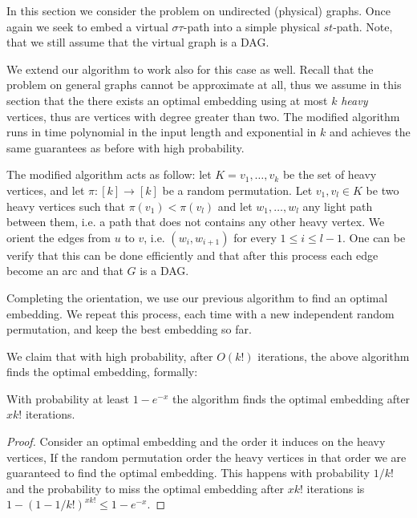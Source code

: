 In this section we consider the problem on undirected (physical) graphs.
Once again we seek to embed a virtual $\sigma\tau$-path 
into a simple physical $st$-path.
Note, that we still assume that the virtual graph is a DAG. 

We extend our algorithm to work also for this case as well.
Recall that the problem on general graphs cannot be approximate at all,
thus we assume in this section that the there exists an optimal embedding using
at most $k$ \emph{heavy} vertices, thus are vertices with degree greater than two.
The modified algorithm runs in time polynomial in the input length and
exponential in $k$ and achieves the same guarantees as before with high
probability.

The modified algorithm acts as follow:
let $K = {v_1, \ldots, v_k}$ be the set of heavy vertices, and let 
$\pi:[k] \to [k]$ be a random permutation.
Let $v_1, v_l \in K$ be two heavy vertices such that $\pi(v_1) < \pi(v_l)$ and
let $w_1, \ldots, w_l$ any light path between them, i.e. a path that does not
contains any other heavy vertex.
We orient the edges from $u$ to $v$, i.e. $(w_i, w_{i+1})$ for every 
$1 \leq i \leq l - 1$.
One can be verify that this can be done efficiently and that after this process
each edge become an arc and that $G$ is a DAG.

Completing the orientation, we use our previous algorithm to find an optimal
embedding.
We repeat this process, each time with a new independent random permutation, and
keep the best embedding so far.

We claim that with high probability, after $O(k!)$ iterations, the above
algorithm finds the optimal embedding, formally:

\begin{theorem}
With probability at least $1 - e^{-x}$ the algorithm finds the optimal embedding
after $xk!$ iterations.
\end{theorem}

\begin{proof}
Consider an optimal embedding and the order it induces on the heavy vertices,
If the random permutation order the heavy vertices in that order we are
guaranteed to find the optimal embedding.
This happens with probability $1/k!$ and the probability to miss the optimal
embedding after $xk!$ iterations is $1 - (1 - 1/k!)^{xk!} \leq 1 - e^{-x}$.
\end{proof}
